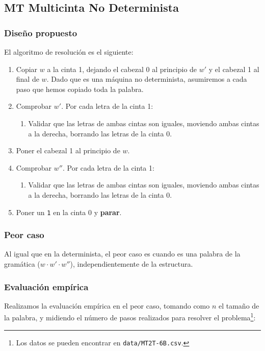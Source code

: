 \subsection{MT Multicinta No Determinista}

\subsubsection*{Diseño propuesto}
El algoritmo de resolución es el siguiente:

\begin{enumerate}
    \item Copiar $w$ a la cinta 1, dejando el cabezal 0 al principio de $w'$ y el cabezal 1 al final de $w$. Dado que es una máquina no determinista, asumiremos a cada paso que hemos copiado toda la palabra.
    \item Comprobar $w'$. Por cada letra de la cinta 1:
    \begin{enumerate}[1.]
        \item Validar que las letras de ambas cintas son iguales, moviendo ambas cintas a la derecha, borrando las letras de la cinta 0.
    \end{enumerate}
    \item Poner el cabezal 1 al principio de $w$.
    \item Comprobar $w''$. Por cada letra de la cinta 1:
    \begin{enumerate}[1.]
        \item Validar que las letras de ambas cintas son iguales, moviendo ambas cintas a la derecha, borrando las letras de la cinta 0.
    \end{enumerate}
    \item Poner un \texttt{1} en la cinta 0 y \textbf{parar}.
\end{enumerate}



\subsubsection*{Peor caso}
Al igual que en la determinista, el peor caso es cuando es una palabra de la gramática ($w \cdot w' \cdot w''$), independientemente de la estructura.


\subsubsection*{Evaluación empírica}
Realizamos la evaluación empírica en el peor caso, tomando como $n$ el tamaño de la palabra, y midiendo el número de pasos realizados para resolver el problema\footnote{Los datos se pueden encontrar en \texttt{data/MT2T-6B.csv}.}:

